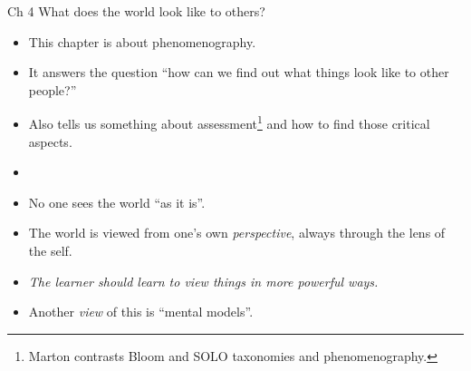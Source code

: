 \begin{frame}
  \begin{block}{Ch 4 What does the world look like to others?}
    \begin{itemize}
      \item This chapter is about phenomenography.
      \item It answers the question \enquote{how can we find out what things 
        look like to other people?}
      \item Also tells us something about assessment\footnote{%
          Marton contrasts Bloom and SOLO taxonomies and phenomenography.
        } and how to find those critical aspects.
    \end{itemize}
  \end{block}

  \pause

  \begin{example}
    \begin{itemize}
      \item {}
    \end{itemize}
  \end{example}
\end{frame}

\begin{frame}
  \begin{remark}
    \begin{itemize}
      \item No one sees the world \enquote{as it is}.
      \item The world is viewed from one's own \emph{perspective}, always 
        through the lens of the self.
      \item \emph{The learner should learn to view things in more powerful 
        ways.}
    \end{itemize}
  \end{remark}

  \pause

  \begin{remark}
    \begin{itemize}
      \item Another \emph{view} of this is \enquote{mental models}.
    \end{itemize}
  \end{remark}
\end{frame}

